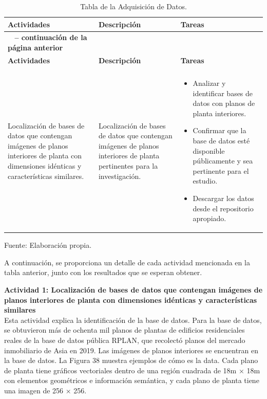 \begin{longtable}{>{\raggedright\arraybackslash}p{4cm} >{\raggedright\arraybackslash}p{4cm} >{\raggedright\arraybackslash}p{5cm}}
    \caption{Tabla de la Adquisición de Datos.}
    \label{tabla:actividades}\\
    \hline
    \textbf{Actividades} & \textbf{Descripción} & \textbf{Tareas}\\
    \hline
    \endfirsthead

    \multicolumn{3}{c}%
    {{\bfseries \tablename\ \thetable{} -- continuación de la página anterior}} \\
    \hline
    \textbf{Actividades} & \textbf{Descripción} & \textbf{Tareas}\\
    \hline
    \endhead

    \hline
    \multicolumn{3}{r}{{Continúa en la siguiente página}} \\
    \endfoot

    \hline
    \endlastfoot

    Localización de bases de datos que contengan imágenes de planos interiores de planta con dimensiones idénticas y características similares. & Localización de bases de datos que contengan imágenes de planos interiores de planta pertinentes para la investigación. & 
    \begin{itemize}
        \item Analizar y identificar bases de datos con planos de planta interiores.
        \item Confirmar que la base de datos esté disponible públicamente y sea pertinente para el estudio.
        \item Descargar los datos desde el repositorio apropiado.
    \end{itemize} \\
\end{longtable}


\begin{flushleft}
    \small Fuente: Elaboración propia.
\end{flushleft}

A continuación, se proporciona un detalle de cada actividad mencionada en la tabla anterior, junto con los resultados que se esperan obtener.

\textbf{Actividad 1: Localización de bases de datos que contengan imágenes de planos interiores de planta con dimensiones idénticas y características similares}
\\
Esta actividad explica la identificación de la base de datos. Para la base de datos, se obtuvieron más de ochenta mil planos de plantas de edificios residenciales reales de la base de datos pública RPLAN, que recolectó planos del mercado inmobiliario de Asia en 2019. Las imágenes de planos interiores se encuentran en la base de datos. La Figura 38 muestra ejemplos de cómo es la data. Cada plano de planta tiene gráficos vectoriales dentro de una región cuadrada de 18m × 18m con elementos geométricos e información semántica, y cada plano de planta tiene una imagen de 256 × 256.


